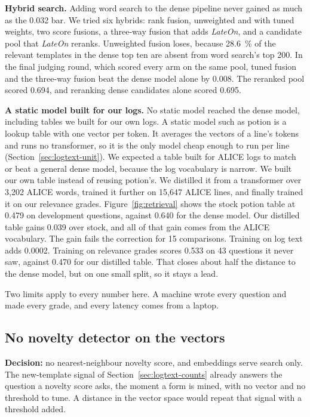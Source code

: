 \textbf{Hybrid search.} Adding word search to the dense pipeline never gained as much as the 0.032 bar. We tried six hybrids: rank fusion, unweighted and with tuned weights, two score fusions, a three-way fusion that adds \textit{LateOn}, and a candidate pool that \textit{LateOn} reranks. Unweighted fusion loses, because 28.6~\% of the relevant templates in the dense top ten are absent from word search's top 200. In the final judging round, which scored every arm on the same pool, tuned fusion and the three-way fusion beat the dense model alone by 0.008. The reranked pool scored 0.694, and reranking dense candidates alone scored 0.695.

\textbf{A static model built for our logs.} No static model reached the dense model, including tables we built for our own logs. A static model such as potion is a lookup table with one vector per token. It averages the vectors of a line's tokens and runs no transformer, so it is the only model cheap enough to run per line (Section~\ref{sec:logtext-unit}). We expected a table built for ALICE logs to match or beat a general dense model, because the log vocabulary is narrow. We built our own table instead of reusing potion's. We distilled it from a transformer over 3,202 ALICE words, trained it further on 15,647 ALICE lines, and finally trained it on our relevance grades. Figure~\ref{fig:retrieval} shows the stock potion table at 0.479 on development questions, against 0.640 for the dense model. Our distilled table gains 0.039 over stock, and all of that gain comes from the ALICE vocabulary. The gain fails the correction for 15 comparisons. Training on log text adds 0.0002. Training on relevance grades scores 0.533 on 43 questions it never saw, against 0.470 for our distilled table. That closes about half the distance to the dense model, but on one small split, so it stays a lead.

Two limits apply to every number here. A machine wrote every question and made every grade, and every latency comes from a laptop.

\subsection{No novelty detector on the vectors}\label{sec:logtext-knn}

\textbf{Decision:} no nearest-neighbour novelty score, and embeddings serve search only. The new-template signal of Section~\ref{sec:logtext-counts} already answers the question a novelty score asks, the moment a form is mined, with no vector and no threshold to tune. A distance in the vector space would repeat that signal with a threshold added.

